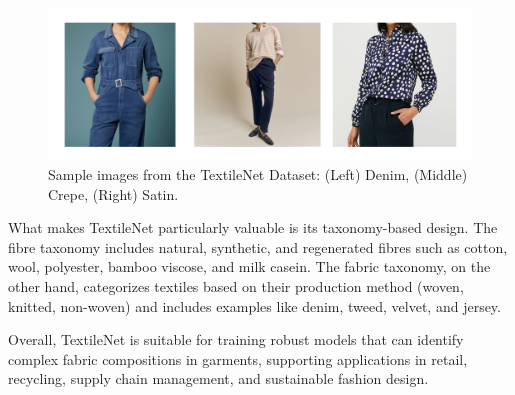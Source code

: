 \begin{figure}[H]
    \centering
    \begin{minipage}{0.8\linewidth}
        \includegraphics[width=\linewidth]{images/TextileNetDataset.png}
    \end{minipage}
    \caption[Sample images from the TextileNet Dataset]{Sample images from the TextileNet Dataset: (Left) Denim, (Middle) Crepe, (Right) Satin.}
\end{figure}

What makes TextileNet particularly valuable is its taxonomy-based design. The fibre taxonomy includes natural, synthetic, and regenerated fibres such as cotton, wool, polyester, bamboo viscose, and milk casein. The fabric taxonomy, on the other hand, categorizes textiles based on their production method (woven, knitted, non-woven) and includes examples like denim, tweed, velvet, and jersey.


Overall, TextileNet is suitable for training robust models that can identify complex fabric compositions in garments, supporting applications in retail, recycling, supply chain management, and sustainable fashion design.